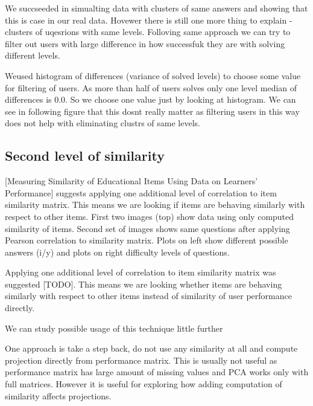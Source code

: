 \documentclass[
  digital, %
  table,   %
  nolof,     %
  nolot,     %
  nocover
]{fithesis3}
\begin{document}
We succseeded in simualting data with clusters of same answers and
showing that this is case in our real data. Hovewer there is still one
more thing to explain - clusters of uqesrions with same levels.
Folloving same approach we can try to filter out users with large
difference in how successfuk they are with solving different levels.

Weused histogram of differences (variance of solved levels) to choose
some value for filtering of users. As more than half of users solves
only one level median of differences is 0.0. So we choose one value just
by looking at histogram. We can see in following figure that this dosnt
really matter as filtering users in this way does not help with
eliminating clustrs of same levels.



\subsection{Second level of
similarity}\label{second-level-of-similarity}

{[}Measuring Similarity of Educational Items Using Data on Learners'
Performance{]} suggests applying one additional level of correlation to
item similarity matrix. This means we are looking if items are behaving
similarly with respect to other items. First two images (top) show data
using only computed similarity of items. Second set of images shows same
questions after applying Pearson correlation to similarity matrix. Plots
on left show different possible answers (i/y) and plots on right
difficulty levels of questions.

Applying one additional level of correlation to item similarity matrix
was suggested {[}TODO{]}. This means we are looking whether items are
behaving similarly with respect to other items instead of similarity of
user performance directly.

We can study possible usage of this technique little further

One approach is take a step back, do not use any similarity at all and
compute projection directly from performance matrix. This is usually not
useful as performance matrix has large amount of missing values and PCA
works only with full matrices. However it is useful for exploring how
adding computation of similarity affects projections.
\end{document}
